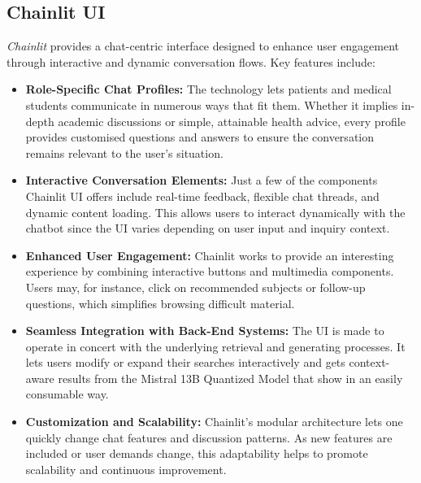 \subsection{Chainlit UI}
\label{subsec:chainlit_ui}
\emph{Chainlit} provides a chat-centric interface designed to enhance user engagement through interactive and dynamic conversation flows. Key features include:
\begin{itemize}[itemsep=2em]
    \item \textbf{Role-Specific Chat Profiles:} The technology lets patients and medical students communicate in numerous ways that fit them.  Whether it implies in-depth academic discussions or simple, attainable health advice, every profile provides customised questions and answers to ensure the conversation remains relevant to the user's situation.
    \item \textbf{Interactive Conversation Elements:} Just a few of the components Chainlit UI offers include real-time feedback, flexible chat threads, and dynamic content loading.  This allows users to interact dynamically with the chatbot since the UI varies depending on user input and inquiry context.
    \item \textbf{Enhanced User Engagement:} Chainlit works to provide an interesting experience by combining interactive buttons and multimedia components.  Users may, for instance, click on recommended subjects or follow-up questions, which simplifies browsing difficult material.
    \item \textbf{Seamless Integration with Back-End Systems:} The UI is made to operate in concert with the underlying retrieval and generating processes. It lets users modify or expand their searches interactively and gets context-aware results from the Mistral 13B Quantized Model that show in an easily consumable way.
    \item \textbf{Customization and Scalability:} Chainlit's modular architecture lets one quickly change chat features and discussion patterns. As new features are included or user demands change, this adaptability helps to promote scalability and continuous improvement.
\end{itemize}

\vspace{5cm}
